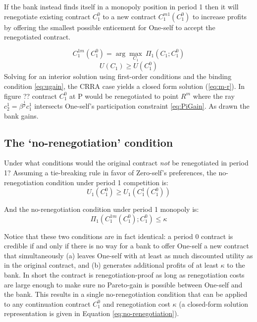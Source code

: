 \documentclass[11pt,english]{article}
\theoremstyle{plain}
\theoremstyle{definition}
\begin{document}
If the bank instead finds itself in a monopoly position in period
1 then it will renegotiate existing contract $C_{1}^{0}$ to a new
contract $C_{1}^{m1}(C_{1}^{0})$ to increase profits by offering
the smallest possible enticement for One-self to accept the renegotiated
contract.

\begin{equation}
C_{1}^{1m}(C_{1}^{0})=\arg\max_{C_{1}}\ \Pi_{1}(C_{1};C_{1}^{0})
\end{equation}
\begin{equation}
U(C_{1})\geq U(C_{1}^{0})\label{eq:ugain}
\end{equation}
Solving for an interior solution using first-order conditions and
the binding condition \ref{eq:ugain}, the CRRA case yields a closed
form solution (\ref{eq:m-r}). In figure ?? contract $C_{1}^{0}$
at P would be renegotiated to point $R^{m}$ where the ray $c_{2}^{1}=\beta^{\frac{1}{\rho}}c_{1}^{1}$
intersects One-self's participation constraint \ref{eq:PiGain}. As
drawn the bank gains.

\subsection{The `no-renegotiation' condition}

\label{sec-no-reneg-cond}

Under what conditions would the original contract \textit{not} be
renegotiated in period 1? Assuming a tie-breaking rule in favor of
Zero-self's preferences, the no-renegotiation condition under period
1 competition is: 
\begin{equation}
U_{1}\left(C_{1}^{0}\right)\geq U_{1}\left(C_{1}^{1}(C_{1}^{0})\right)\label{eq:no-reg-comp}
\end{equation}

And the no-renegotiation condition under period 1 monopoly is: 
\begin{equation}
\Pi_{1}(C_{1}^{1m}\left(C_{1}^{0}\right);C_{1}^{0})\leq\kappa\label{eq:no-reg-monop}
\end{equation}

Notice that these two conditions are in fact identical: a period 0
contract is credible if and only if there is no way for a bank to
offer One-self a new contract that simultaneously (a) leaves One-self
with at least as much discounted utility as in the original contract,
and (b) generates additional profits of at least $\kappa$ to the
bank. In short the contract is renegotiation-proof as long as renegotiation
costs are large enough to make sure no Pareto-gain is possible between
One-self and the bank. This results in a single no-renegotiation condition
that can be applied to any continuation contract $C_{1}^{0}$ and
renegotiation cost $\kappa$ (a closed-form solution representation
is given in Equation \ref{eq:no-renegotiation}).
\end{document}
